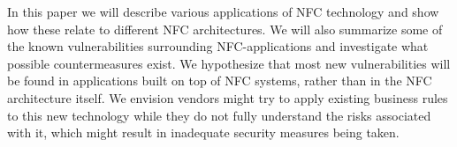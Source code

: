 
In this paper we will describe various applications of NFC technology and show how these relate to different NFC architectures.
We will also summarize some of the known vulnerabilities surrounding NFC-applications and investigate what possible countermeasures exist.
We hypothesize that most new vulnerabilities will be found in applications built on top of NFC systems, rather than in the NFC architecture itself.
We envision vendors might try to apply existing business rules to this new technology while they do not fully understand the risks associated with it, which might result in inadequate security measures being taken.






